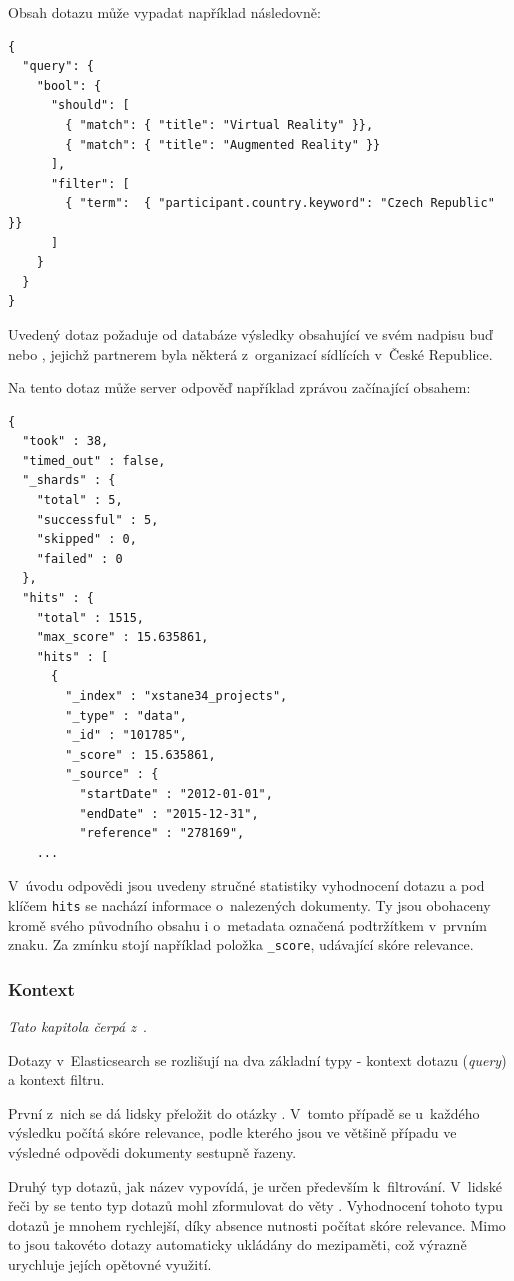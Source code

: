 Obsah dotazu může vypadat například následovně:
\begin{verbatim}
{
  "query": { 
    "bool": { 
      "should": [
        { "match": { "title": "Virtual Reality" }}, 
        { "match": { "title": "Augmented Reality" }}  
      ],
      "filter": [ 
        { "term":  { "participant.country.keyword": "Czech Republic" }}
      ]
    }
  }
}
\end{verbatim}

Uvedený dotaz požaduje od databáze výsledky obsahující ve svém nadpisu buď  nebo , jejichž partnerem byla některá z~organizací sídlících v~České Republice.

Na tento dotaz může server odpověď například zprávou začínající obsahem:

\begin{verbatim}
{
  "took" : 38,
  "timed_out" : false,
  "_shards" : {
    "total" : 5,
    "successful" : 5,
    "skipped" : 0,
    "failed" : 0
  },
  "hits" : {
    "total" : 1515,
    "max_score" : 15.635861,
    "hits" : [
      {
        "_index" : "xstane34_projects",
        "_type" : "data",
        "_id" : "101785",
        "_score" : 15.635861,
        "_source" : {
          "startDate" : "2012-01-01",
          "endDate" : "2015-12-31",
          "reference" : "278169",
    ...
\end{verbatim}

V~úvodu odpovědi jsou uvedeny stručné statistiky vyhodnocení dotazu a pod klíčem \texttt{hits} se nachází informace o~nalezených dokumenty. Ty jsou obohaceny kromě svého původního obsahu i o~metadata označená podtržítkem  v~prvním znaku. Za zmínku stojí například položka \texttt{\_score}, udávající skóre relevance.

\subsubsection*{Kontext}
\emph{Tato kapitola čerpá z~\cite{bib:elastic-context}}.

Dotazy v~Elasticsearch se rozlišují na dva základní typy - kontext dotazu (\emph{query}) a kontext filtru.

První z~nich se dá lidsky přeložit do otázky . V~tomto případě se u~každého výsledku počítá skóre relevance, podle kterého jsou ve většině případu ve výsledné odpovědi dokumenty sestupně řazeny.

Druhý typ dotazů, jak název vypovídá, je určen především k~filtrování. V~lidské řeči by se tento typ dotazů mohl zformulovat do věty . Vyhodnocení tohoto typu dotazů je mnohem rychlejší, díky absence nutnosti počítat skóre relevance. Mimo to jsou takovéto dotazy automaticky ukládány do mezipaměti, což výrazně urychluje jejích opětovné využití. 

